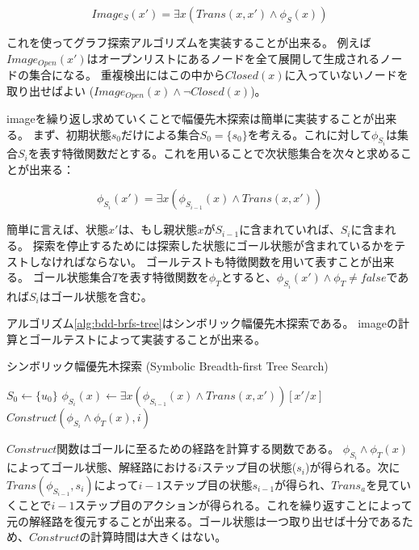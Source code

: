 \begin{equation}
	Image_S(x') = \exists x (Trans(x,x') \land \phi_S(x))
\end{equation}

これを使ってグラフ探索アルゴリズムを実装することが出来る。
例えば$Image_{Open}(x')$はオープンリストにあるノードを全て展開して生成されるノードの集合になる。
重複検出にはこの中から$Closed(x)$に入っていないノードを取り出せばよい ($Image_{Open}(x) \land \lnot Closed(x)$)。


imageを繰り返し求めていくことで幅優先木探索は簡単に実装することが出来る。
まず、初期状態$s_0$だけによる集合$S_0 = \{s_0\}$を考える。これに対して$\phi_{S_{i}}$は集合$S_i$を表す特徴関数だとする。これを用いることで次状態集合を次々と求めることが出来る：

\begin{equation}
	\phi_{S_i}(x') = \exists x (\phi_{S_{i-1}}(x) \land Trans(x,x'))
\end{equation}

簡単に言えば、状態$x'$は、もし親状態$x$が$S_{i-1}$に含まれていれば、$S_i$に含まれる。
探索を停止するためには探索した状態にゴール状態が含まれているかをテストしなければならない。
ゴールテストも特徴関数を用いて表すことが出来る。
ゴール状態集合$T$を表す特徴関数を$\phi_T$とすると、$\phi_{S_i}(x') \land \phi_T \neq false$であれば$S_i$はゴール状態を含む。

アルゴリズム\ref{alg:bdd-brfs-tree}はシンボリック幅優先木探索である。
imageの計算とゴールテストによって実装することが出来る。


\begin{algorithm}
\caption{シンボリック幅優先木探索 (Symbolic Breadth-first Tree Search)}
\label{alg:bdd-brfs-tree}
	$S_0 \leftarrow \{u_0\}$\;
	 {
		$\phi_{S_i}(x) \leftarrow \exists x (\phi_{S_{i-1}}(x) \land Trans(x,x'))[x'/x]$\;
		 {
			\Return $Construct(\phi_{S_i} \land \phi_T(x), i)$\;
		}
	}
\end{algorithm}


$Construct$関数はゴールに至るための経路を計算する関数である。
$\phi_{S_i} \land \phi_T(x)$によってゴール状態、解経路における$i$ステップ目の状態($s_i$)が得られる。次に$Trans(\phi_{S_{i-1}}, s_i)$によって$i-1$ステップ目の状態$s_{i-1}$が得られ、$Trans_a$を見ていくことで$i-1$ステップ目のアクションが得られる。これを繰り返すことによって元の解経路を復元することが出来る。ゴール状態は一つ取り出せば十分であるため、$Construct$の計算時間は大きくはない。


